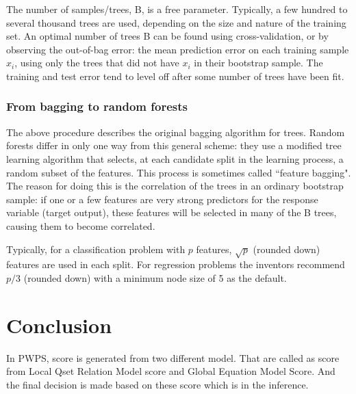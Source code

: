 \documentclass[document.tex]{subfiles}
\begin{document}
The number of samples/trees, B, is a free parameter. Typically, a few hundred to several thousand trees are used, depending on the size and nature of the training set. An optimal number of trees B can be found using cross-validation, or by observing the out-of-bag error: the mean prediction error on each training sample $x_i$, using only the trees that did not have $x_i$ in their bootstrap sample. The training and test error tend to level off after some number of trees have been fit.

\subsubsection{From bagging to random forests}
The above procedure describes the original bagging algorithm for trees. Random forests differ in only one way from this general scheme: they use a modified tree learning algorithm that selects, at each candidate split in the learning process, a random subset of the features. This process is sometimes called ``feature bagging". The reason for doing this is the correlation of the trees in an ordinary bootstrap sample: if one or a few features are very strong predictors for the response variable (target output), these features will be selected in many of the B trees, causing them to become correlated.

Typically, for a classification problem with $p$ features, $\sqrt{p}$ (rounded down) features are used in each split. For regression problems the inventors recommend $p/3$ (rounded down) with a minimum node size of 5 as the default.



\section{Conclusion}
In PWPS, score is generated from two different model. That are called as score from Local Qset Relation Model score and Global Equation Model Score. And the final decision is made based on these score which is in the inference.
\end{document}
